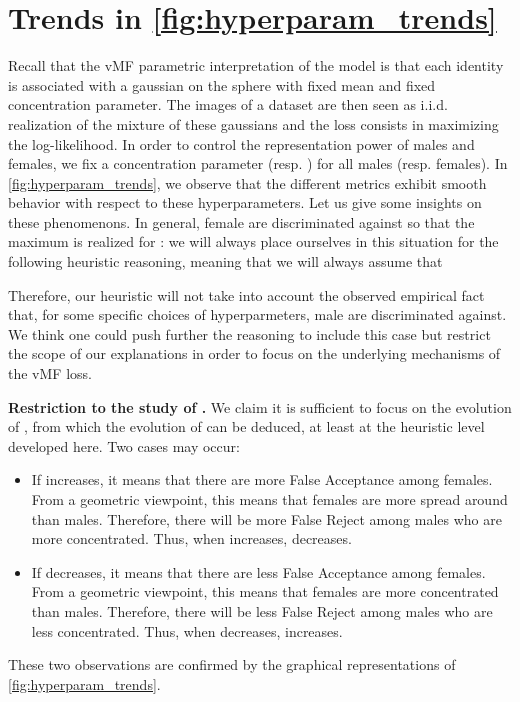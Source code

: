 \documentclass[nohyperref]{article}
\theoremstyle{plain}
\theoremstyle{definition}
\theoremstyle{remark}
\begin{document}
\section{Trends in \autoref{fig:hyperparam_trends}}\label{app:explain_trends_grid_search}

Recall that the vMF parametric interpretation of the model is that each identity is associated with a gaussian on the sphere with fixed mean and fixed concentration parameter. The images of a dataset are then seen as i.i.d. realization of the mixture of these gaussians and the loss consists in maximizing the log-likelihood. In order to control the representation power of males and females, we fix a concentration parameter  (resp. ) for all males (resp. females). In \autoref{fig:hyperparam_trends}, we observe that the different metrics exhibit smooth behavior with respect to these hyperparameters. Let us give some insights on these phenomenons. In general, female are discriminated against so that the maximum is realized for : we will always place ourselves in this situation for the following heuristic reasoning, meaning that we will always assume that

Therefore, our heuristic will not take into account the observed empirical fact that, for some specific choices of hyperparmeters, male are discriminated against. We think one could push further the reasoning to include this case but restrict the scope of our explanations in order to focus on the underlying mechanisms of the vMF loss.

{\bf Restriction to the study of .} We claim it is sufficient to focus on the evolution of , from which the evolution of  can be deduced, at least at the heuristic level developed here. Two cases may occur:
\begin{itemize}
    \item If  increases, it means that there are more False Acceptance among females. From a geometric viewpoint, this means that females are more spread around than males. Therefore, there will be more False Reject among males who are more concentrated. Thus, when  increases,  decreases.
    \item If  decreases, it means that there are less False Acceptance among females. From a geometric viewpoint, this means that females are more concentrated than males. Therefore, there will be less False Reject among males who are less concentrated. Thus, when  decreases,  increases.
\end{itemize}
These two observations are confirmed by the graphical representations of \autoref{fig:hyperparam_trends}.
\end{document}
